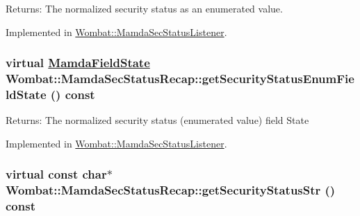 \begin{Desc}
\item[Returns:]The normalized security status as an enumerated value. \end{Desc}


Implemented in \hyperlink{classWombat_1_1MamdaSecStatusListener_2cff8818f54794f33a5b0a697bd8215a}{Wombat::Mamda\-Sec\-Status\-Listener}.\hypertarget{classWombat_1_1MamdaSecStatusRecap_abd7b41fb4189d19dc1a064d78c58d3f}{
\subsubsection[getSecurityStatusEnumFieldState]{\setlength{\rightskip}{0pt plus 5cm}virtual \hyperlink{namespaceWombat_93aac974f2ab713554fd12a1fa3b7d2a}{Mamda\-Field\-State} Wombat::Mamda\-Sec\-Status\-Recap::get\-Security\-Status\-Enum\-Field\-State () const}}
\label{classWombat_1_1MamdaSecStatusRecap_abd7b41fb4189d19dc1a064d78c58d3f}


\begin{Desc}
\item[Returns:]The normalized security status (enumerated value) field State \end{Desc}


Implemented in \hyperlink{classWombat_1_1MamdaSecStatusListener_835f73068705630588709dcdaae9ccda}{Wombat::Mamda\-Sec\-Status\-Listener}.\hypertarget{classWombat_1_1MamdaSecStatusRecap_4f195cb017b796ba8d82cd3c3b1c1504}{
\subsubsection[getSecurityStatusStr]{\setlength{\rightskip}{0pt plus 5cm}virtual const char$\ast$ Wombat::Mamda\-Sec\-Status\-Recap::get\-Security\-Status\-Str () const}}
\label{classWombat_1_1MamdaSecStatusRecap_4f195cb017b796ba8d82cd3c3b1c1504}



